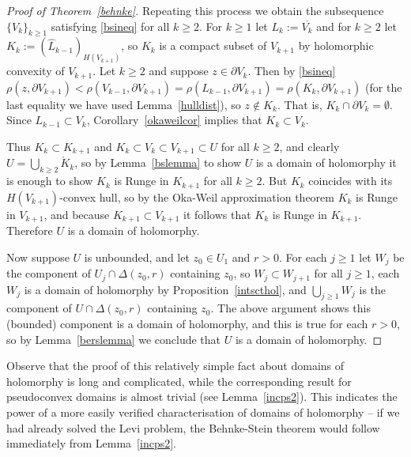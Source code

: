 \documentclass[11pt,a4paper, final, twoside]{article}
\numberwithin{equation}{section}
\newcommand{\clos}[1]{\overline{#1}}
\newcommand{\bd}{\partial}
\newcommand{\inter}[1]{\mathring{#1}}
\newcommand{\pdisc}{\Delta}
\newcommand{\pmetric}{\rho}
\newcommand{\hol}{H}
\begin{document}
\begin{proof}[Proof of Theorem~\ref{behnke}]
Repeating this process we obtain the subsequence $\{V_k\}_{k\geq 1}$ satisfying \eqref{bsineq} for all $k\geq 2$. For $k\geq 1$ let $L_k:=\clos{V_k}$ and for 
$k\geq 2$ let $K_k:=(\hat L_{k-1})_{\hol(V_{k+1})}$, so $K_k$ is a compact subset of $V_{k+1}$ by holomorphic convexity of $V_{k+1}$. Let $k\geq 2$ and suppose
$z\in\bd V_k$. Then by \eqref{bsineq} $\pmetric(z,\bd V_{k+1})<\pmetric(V_{k-1},\bd V_{k+1})=\pmetric(L_{k-1},\bd V_{k+1})=\pmetric(K_k,\bd V_{k+1})$ (for the last equality we have
used Lemma~\ref{hulldist}), so $z\not\in K_k$. That is, $K_k\cap \bd V_k=\emptyset$. Since $L_{k-1}\subset V_k$, Corollary~\ref{okaweilcor} implies that $K_k\subset V_k$.

Thus $K_k\subset K_{k+1}$ and $K_k\subset V_k\subset V_{k+1}\subset U$ for all $k\geq 2$, and clearly $U=\bigcup_{k\geq 2} \inter K_k$, so by Lemma~\ref{bslemma} to show $U$ is a domain of holomorphy
it is enough to show $K_k$ is Runge in $K_{k+1}$ for all $k\geq 2$. But $K_k$ coincides with its $\hol(V_{k+1})$-convex hull, so by the Oka-Weil approximation theorem
$K_k$ is Runge in $V_{k+1}$, and because $K_{k+1}\subset V_{k+1}$ it follows that $K_k$ is Runge in $K_{k+1}$. Therefore $U$ is a domain of holomorphy.

Now suppose $U$ is unbounded, and let $z_0\in U_1$ and $r>0$. For each $j\geq 1$ let $W_j$ be 
the component of $U_j\cap \pdisc(z_0,r)$ containing $z_0$, so $W_j\subset W_{j+1}$ for all $j\geq 1$, each $W_j$ is a domain of holomorphy by Proposition~\ref{intscthol},
and $\bigcup_{j\geq 1} W_j$ is the component of $U\cap \pdisc(z_0,r)$ containing $z_0$. The above argument shows this (bounded) component is a domain of holomorphy, and this is true for each $r>0$,
so by Lemma~\ref{berslemma} we conclude that $U$ is a domain of holomorphy.
\end{proof}
Observe that the proof of this relatively simple fact about domains of holomorphy is long and complicated, while the corresponding result for pseudoconvex domains
is almost trivial (see Lemma~\ref{incps2}). This indicates the power of a more easily verified characterisation of domains of holomorphy -- if we had already solved the Levi
problem, the Behnke-Stein theorem would follow immediately from Lemma~\ref{incps2}. 
\end{document}
